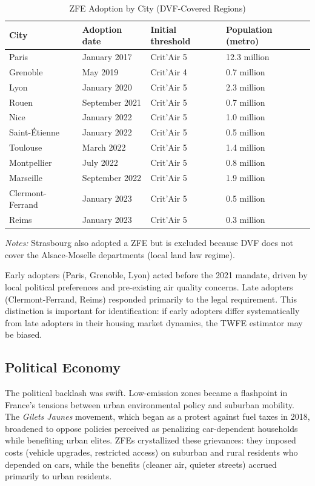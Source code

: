 \documentclass[12pt]{article}
\begin{document}
\begin{table}[H]
\centering
\caption{ZFE Adoption by City (DVF-Covered Regions)}
\label{tab:zfe_cities}
\begin{tabular}{llll}
\hline\hline
City & Adoption date & Initial threshold & Population (metro) \\
\hline
Paris & January 2017 & Crit'Air 5 & 12.3 million \\
Grenoble & May 2019 & Crit'Air 4 & 0.7 million \\
Lyon & January 2020 & Crit'Air 5 & 2.3 million \\
Rouen & September 2021 & Crit'Air 5 & 0.7 million \\
Nice & January 2022 & Crit'Air 5 & 1.0 million \\
Saint-\'Etienne & January 2022 & Crit'Air 5 & 0.5 million \\
Toulouse & March 2022 & Crit'Air 5 & 1.4 million \\
Montpellier & July 2022 & Crit'Air 5 & 0.8 million \\
Marseille & September 2022 & Crit'Air 5 & 1.9 million \\
Clermont-Ferrand & January 2023 & Crit'Air 5 & 0.5 million \\
Reims & January 2023 & Crit'Air 5 & 0.3 million \\
\hline\hline
\end{tabular}
\begin{tablenotes}[flushleft]
\small \textit{Notes:} Strasbourg also adopted a ZFE but is excluded because DVF does not cover the Alsace-Moselle departments (local land law regime).
\end{tablenotes}
\end{table}

Early adopters (Paris, Grenoble, Lyon) acted before the 2021 mandate, driven by local political preferences and pre-existing air quality concerns. Late adopters (Clermont-Ferrand, Reims) responded primarily to the legal requirement. This distinction is important for identification: if early adopters differ systematically from late adopters in their housing market dynamics, the TWFE estimator may be biased.

\subsection{Political Economy}

The political backlash was swift. Low-emission zones became a flashpoint in France's tensions between urban environmental policy and suburban mobility. The \textit{Gilets Jaunes} movement, which began as a protest against fuel taxes in 2018, broadened to oppose policies perceived as penalizing car-dependent households while benefiting urban elites. ZFEs crystallized these grievances: they imposed costs (vehicle upgrades, restricted access) on suburban and rural residents who depended on cars, while the benefits (cleaner air, quieter streets) accrued primarily to urban residents.
\end{document}
